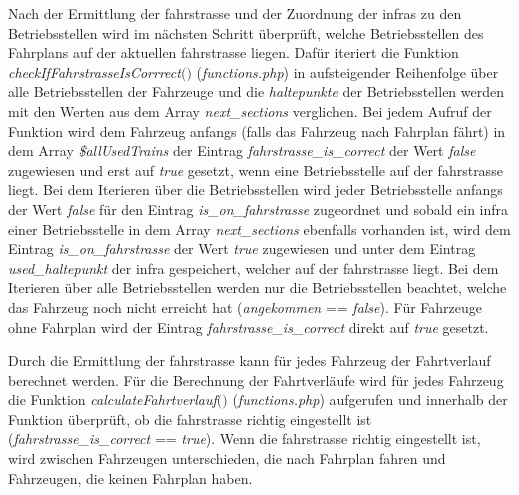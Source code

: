 Nach der Ermittlung der \Gls{fahrstrasse} und der Zuordnung der \acp{infra} zu den Betriebsstellen wird im nächsten Schritt überprüft, welche Betriebsstellen des Fahrplans auf der aktuellen \Gls{fahrstrasse} liegen. Dafür iteriert die Funktion \textit{check\-If\-Fahr\-strasse\-Is\-Corrrect$($$)$} (\textit{functions.php}) in aufsteigender Reihenfolge über alle Betriebsstellen der Fahrzeuge und die \textit{haltepunkte} der Betriebsstellen werden mit den Werten aus dem Array \textit{next\_sections} verglichen. Bei jedem Aufruf der Funktion wird dem Fahrzeug anfangs (falls das Fahrzeug nach Fahrplan fährt) in dem Array \textit{\$allUsedTrains} der Eintrag \textit{fahrstrasse\_is\_correct} der Wert \textit{false} zugewiesen und erst auf \textit{true} gesetzt, wenn eine Betriebsstelle auf der \Gls{fahrstrasse} liegt. Bei dem Iterieren über die Betriebsstellen wird jeder Betriebsstelle anfangs der Wert \textit{false} für den Eintrag \textit{is\_on\_fahrstrasse} zugeordnet und sobald ein \ac{infra} einer Betriebsstelle in dem Array \textit{next\_sections} ebenfalls vorhanden ist, wird dem Eintrag \textit{is\_on\_fahrstrasse} der Wert \textit{true} zugewiesen und unter dem Eintrag \textit{used\_haltepunkt} der \ac{infra} gespeichert, welcher auf der \Gls{fahrstrasse} liegt. Bei dem Iterieren über alle Betriebsstellen werden nur die Betriebsstellen beachtet, welche das Fahrzeug noch nicht erreicht hat (\textit{angekommen} == \textit{false}). Für Fahrzeuge ohne Fahrplan wird der Eintrag \textit{fahrstrasse\_is\_correct} direkt auf \textit{true} gesetzt.

Durch die Ermittlung der \Gls{fahrstrasse} kann für jedes Fahrzeug der Fahrtverlauf berechnet werden. Für die Berechnung der Fahrtverläufe wird für jedes Fahrzeug die Funktion \textit{calculateFahrtverlauf$($$)$} (\textit{functions.php}) aufgerufen und innerhalb der Funktion überprüft, ob die \Gls{fahrstrasse} richtig eingestellt ist (\textit{fahrstrasse\_is\_correct} == \textit{true}). Wenn die \Gls{fahrstrasse} richtig eingestellt ist, wird zwischen Fahrzeugen unterschieden, die nach Fahrplan fahren und Fahrzeugen, die keinen Fahrplan haben. 

